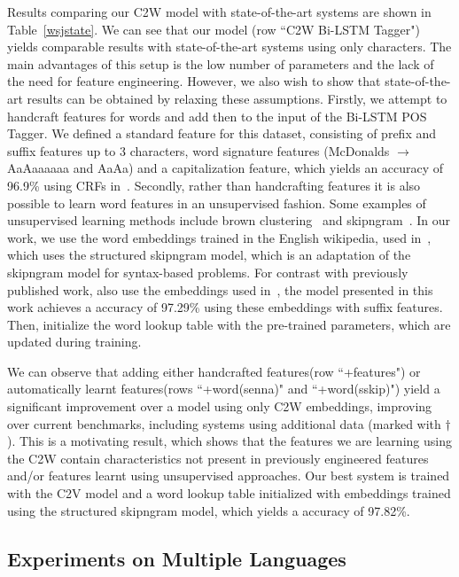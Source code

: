 \documentclass[11pt]{article}
\begin{document}
\begin{CJK*}{UTF8}{gbsn}
{Results comparing our C2W model with state-of-the-art systems are shown in Table~\ref{wsjstate}. We can see that our model (row ``C2W Bi-LSTM Tagger") yields comparable results with state-of-the-art systems using only characters. The main advantages of this setup is the low number of parameters and the lack of the need for feature engineering. However, we also wish to show that state-of-the-art results can be obtained by relaxing these assumptions. Firstly, we attempt to handcraft features for words and add then to the input of the Bi-LSTM POS Tagger. We defined a standard feature for this dataset, consisting of prefix and suffix features up to 3 characters, word signature features (McDonalds $\to$ AaAaaaaaa and AaAa) and a capitalization feature, which yields an accuracy of 96.9\% using CRFs in~\cite{Liang08structurecompilation}. Secondly, rather than handcrafting features it is also possible to learn word features in an unsupervised fashion. Some examples of unsupervised learning methods include brown clustering~\cite{Brown:1992:CNG:176313.176316} and skipngram~\cite{mikolov2013distributed}. In our work, we use the word embeddings trained in the English wikipedia, used in~\cite{Ling:2015:naacl}, which uses the structured skipngram model, which is an adaptation of the skipngram model for syntax-based problems. For contrast with previously published work, also use the embeddings used in~\cite{collobert2011natural}, the model presented in this work achieves a accuracy of 97.29\% using these embeddings with suffix features. Then, initialize the word lookup table with the pre-trained parameters, which are updated during training.  

We can observe that adding either handcrafted features(row ``+features") or automatically learnt features(rows ``+word(senna)" and ``+word(sskip)") yield a significant improvement over a model using only C2W embeddings, improving over current benchmarks, including systems using additional data (marked with $\dagger$). This is a motivating result, which shows that the features we are learning using the C2W contain characteristics not present in previously engineered features and/or features learnt using unsupervised approaches. Our best system is trained with the C2V model and a word lookup table initialized with embeddings trained using the structured skipngram model, which yields a accuracy of 97.82\%.

\subsection{Experiments on Multiple Languages}

}
\end{CJK*}
\end{document}
